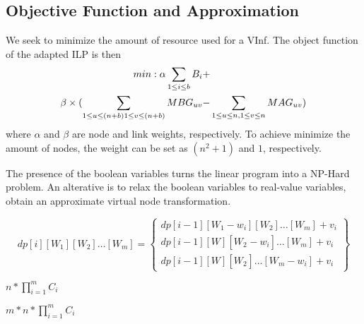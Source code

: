 \subsection{Objective Function and Approximation}
We seek to minimize the amount of resource used for a VInf. The object function of the adapted ILP is then
\begin{align}
min: \alpha \sum_{1\leq i\leq b}B_i+ & \notag \\
\beta \times(\sum_{1\leq u\leq (n+b) 1\leq v\leq (n+b)}MBG_{uv}-&\sum_{1\leq u\leq n,1\leq v\leq n}MAG_{uv})
\end{align}
where $\alpha$ and $\beta$ are node and link weights, respectively. To achieve minimize the amount of nodes, the weight can be set as $(n^2+1)$ and $1$, respectively.

The presence of the boolean variables turns the linear program into a NP-Hard problem. An alterative is to relax the boolean variables to real-value variables, obtain an approximate virtual node transformation.




\begin{equation}
dp[i][{W_1}][{W_2}] \ldots [{W_m}] = \left\{ \begin{array}{l}
dp[i - 1][{W_1} - {w_i}][{W_2}] \ldots [{W_m}] + {v_i}\\
dp[i - 1][W][{W_2}_{} - {w_i}] \ldots [{W_m}] + {v_i}\\
dp[i - 1][W][{W_2}_{}] \ldots [{W_m} - {w_i}] + {v_i}
\end{array} \right\}
\end{equation}

$n*\prod_{i=1}^mC_i$

$m*n*\prod_{i=1}^mC_i$

